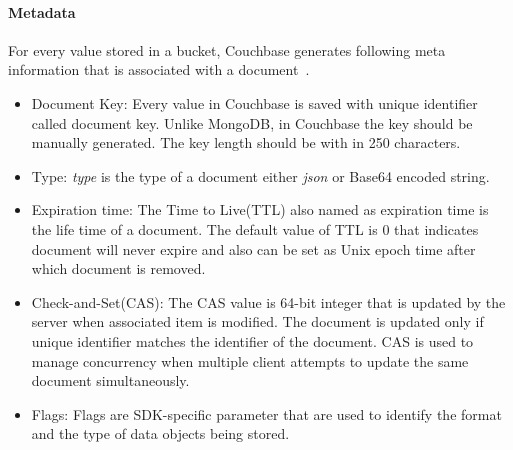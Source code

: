 \paragraph{Metadata}\label{cb-metadata}
For every value stored in a bucket, Couchbase generates following meta information that is associated with a document~\cite[p. 26]{cb/ostrovsky2014pro}. 
\begin{itemize}
\item{Document Key:}
 Every value in Couchbase is saved with unique identifier called document key. Unlike MongoDB, in Couchbase the key should be manually generated. The key length should be with in 250 characters.
 
 
\item{Type:}
 \textit{type} is the type of a document either \textit{json} or Base64 encoded string.
 	\item{Expiration time:}
		The Time to Live(TTL) also named as expiration time is the life time of a document. The default value of TTL is 0 that indicates document will never expire and also can be set as Unix epoch time after which document is removed.
	\item{Check-and-Set(CAS):}
		The CAS value is 64-bit integer that is updated by the server when associated item is modified. The document is updated only  if unique identifier matches the identifier of the document. CAS is used to manage concurrency when multiple client attempts to update the same document simultaneously. 
	\item{Flags:} 
Flags are SDK-specific parameter that are used to identify the format and the type of data objects being stored.

\end{itemize}	

